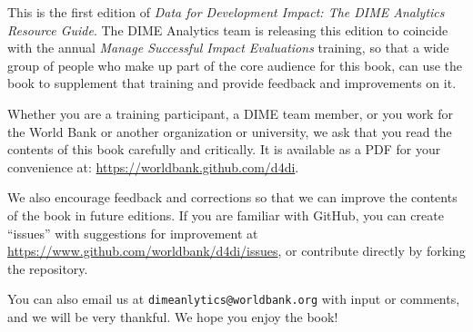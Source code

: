 This is the first edition of
\textit{Data for Development Impact:
The DIME Analytics Resource Guide}.
The DIME Analytics team is releasing this edition
to coincide with the annual \textit{Manage Successful Impact Evaluations} training,
so that a wide group of people who make up
part of the core audience for this book,
can use the book to supplement that training
and provide feedback and improvements on it.

Whether you are a training participant,
a DIME team member, or you work for the World Bank
or another organization or university,
we ask that you read the contents of this book carefully and critically.
It is available as a PDF for your convenience at:
\url{https://worldbank.github.com/d4di}.

We also encourage feedback and corrections
so that we can improve the contents of the book
in future editions.
If you are familiar with GitHub,
you can create ``issues'' with suggestions for improvement
at \url{https://www.github.com/worldbank/d4di/issues},
or contribute directly by forking the repository.

You can also email us at \texttt{dimeanlytics@worldbank.org}
with input or comments, and we will be very thankful.
We hope you enjoy the book!
